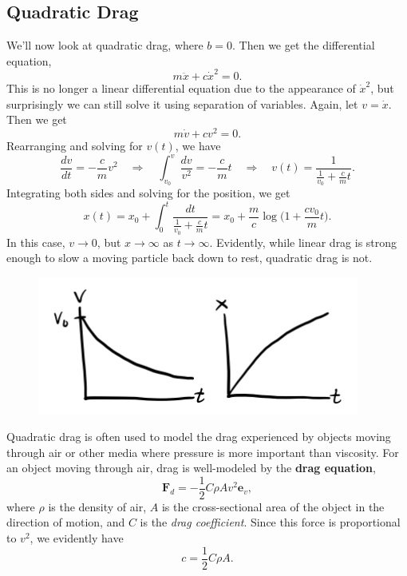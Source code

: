\documentclass[
  letterpaper,
  DIV=11,
  numbers=noendperiod]{scrreprt}
\begin{document}
\hypertarget{quadratic-drag}{%
\subsection{Quadratic Drag}\label{quadratic-drag}}

We'll now look at quadratic drag, where \(b=0\). Then we get the
differential equation, \[
m\ddot x + c \dot x^2 = 0.
\] This is no longer a linear differential equation due to the
appearance of \(\dot x^2\), but surprisingly we can still solve it using
separation of variables. Again, let \(v = \dot x\). Then we get \[
m\dot v + cv^2 = 0.
\] Rearranging and solving for \(v(t)\), we have \[
\frac{dv}{dt} = -\frac{c}{m}v^2 \quad \Longrightarrow \quad
\int_{v_0}^{v} \frac{dv}{v^2} = -\frac{c}{m} t \quad \Longrightarrow \quad
v(t) = \frac{1}{\frac{1}{v_0} + \frac{c}{m}t}.
\] Integrating both sides and solving for the position, we get \[
x(t) = x_0 + \int_0^t \frac{dt}{\frac{1}{v_0} + \frac{c}{m}t} = x_0 + \frac{m}{c}\log\bigg( 1 + \frac{cv_0}{m}t \bigg).
\] In this case, \(v \rightarrow 0\), but \(x \rightarrow \infty\) as
\(t \rightarrow \infty\). Evidently, while linear drag is strong enough
to slow a moving particle back down to rest, quadratic drag is not.

\begin{figure}

{\centering \includegraphics[width=4.16667in,height=\textheight]{classical-mechanics/./resources/image-20230214045706509.png}

}

\end{figure}

Quadratic drag is often used to model the drag experienced by objects
moving through air or other media where pressure is more important than
viscosity. For an object moving through air, drag is well-modeled by the
\textbf{drag equation}, \[
\mathbf{F}_d = -\frac{1}{2}C \rho A v^2 \mathbf{e}_v,
\] where \(\rho\) is the density of air, \(A\) is the cross-sectional
area of the object in the direction of motion, and \(C\) is the
\emph{drag coefficient}. Since this force is proportional to \(v^2\), we
evidently have \[
c = \frac{1}{2}C \rho A.
\]
\end{document}
